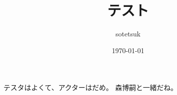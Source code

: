 \documentclass{jsarticle}
\title{テスト}
\author{sotetsuk}
\date{\today}
\begin{document}
\maketitle

テスタはよくて、アクターはだめ。
森博嗣と一緒だね。
\end{document}
